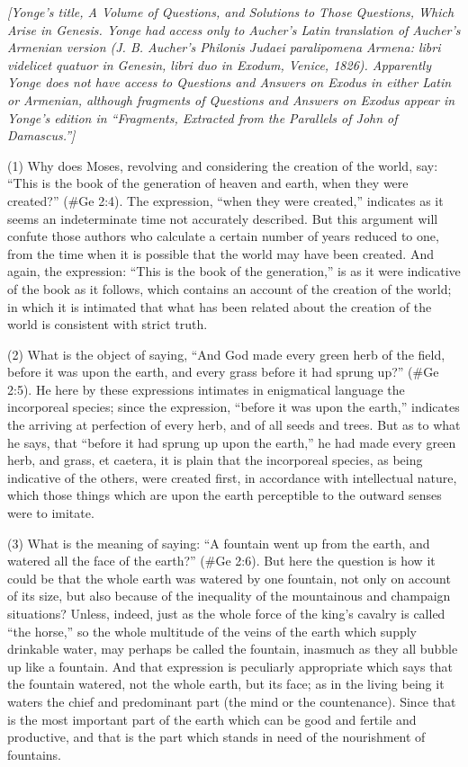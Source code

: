 
\emph{[Yonge's title, A Volume of Questions, and Solutions to Those Questions, Which Arise in Genesis. Yonge had access
only to Aucher's Latin translation of Aucher's Armenian version (J. B. Aucher's Philonis Judaei paralipomena Armena: libri
videlicet quatuor in Genesin, libri duo in Exodum, Venice, 1826). Apparently Yonge does not have access to Questions
and Answers on Exodus in either Latin or Armenian, although fragments of Questions and Answers on Exodus appear in Yonge's edition in ``Fragments, Extracted from the Parallels of John of Damascus.'']}

(1) Why does Moses, revolving and considering the creation of the world, say: ``This is the book
of the generation of heaven and earth, when they were created?'' (\#Ge 2:4). The expression,
``when they were created,'' indicates as it seems an indeterminate time not accurately described.
But this argument will confute those authors who calculate a certain number of years reduced to
one, from the time when it is possible that the world may have been created. And again, the
expression: ``This is the book of the generation,'' is as it were indicative of the book as it follows,
which contains an account of the creation of the world; in which it is intimated that what has been
related about the creation of the world is consistent with strict truth.

(2) What is the object of saying, ``And God made every green herb of the field, before it was upon
the earth, and every grass before it had sprung up?'' (\#Ge 2:5). He here by these expressions
intimates in enigmatical language the incorporeal species; since the expression, ``before it was
upon the earth,'' indicates the arriving at perfection of every herb, and of all seeds and trees. But
as to what he says, that ``before it had sprung up upon the earth,'' he had made every green herb,
and grass, et caetera, it is plain that the incorporeal species, as being indicative of the others,
were created first, in accordance with intellectual nature, which those things which are upon the
earth perceptible to the outward senses were to imitate.

(3) What is the meaning of saying: ``A fountain went up from the earth, and watered all the face of
the earth?'' (\#Ge 2:6). But here the question is how it could be that the whole earth was
watered by one fountain, not only on account of its size, but also because of the inequality of the
mountainous and champaign situations? Unless, indeed, just as the whole force of the king's
cavalry is called ``the horse,'' so the whole multitude of the veins of the earth which supply drinkable
water, may perhaps be called the fountain, inasmuch as they all bubble up like a fountain. And that
expression is peculiarly appropriate which says that the fountain watered, not the whole earth, but
its face; as in the living being it waters the chief and predominant part (the mind or the
countenance). Since that is the most important part of the earth which can be good and fertile and
productive, and that is the part which stands in need of the nourishment of fountains.

